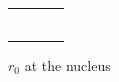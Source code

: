\begin{frame}
\begin{table}
\begin{tabular}{crrr}
                   &                    &                    &                \\
                   &                    &                    &                \\
                   &                    &                    &                \\
                   &                    &                    &                \\
                   &                    &                    &                \\
                   &                    &                    &                \\
\hline
\hline
\end{tabular}
\end{table}
\tiny
$r_0$ at the nucleus
\end{frame}

